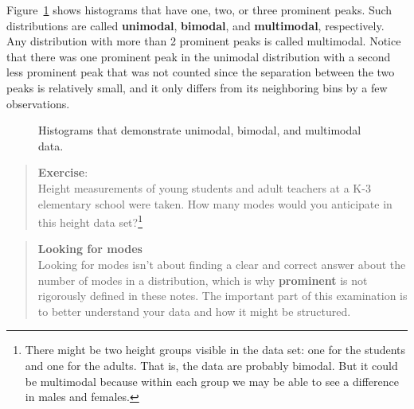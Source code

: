 \documentclass[
  letterpaper,
  DIV=11,
  numbers=noendperiod]{scrreprt}
\begin{document}
Figure~\ref{fig-histmulti} shows histograms that have one, two, or three
prominent peaks. Such distributions are called \textbf{unimodal},
\textbf{bimodal}, and \textbf{multimodal}, respectively. Any
distribution with more than 2 prominent peaks is called multimodal.
Notice that there was one prominent peak in the unimodal distribution
with a second less prominent peak that was not counted since the
separation between the two peaks is relatively small, and it only
differs from its neighboring bins by a few observations.

\begin{figure}


\caption{\label{fig-histmulti}Histograms that demonstrate unimodal,
bimodal, and multimodal data.}

\end{figure}%

\begin{quote}
\textbf{Exercise}:\\
Height measurements of young students and adult teachers at a K-3
elementary school were taken. How many modes would you anticipate in
this height data set?\footnote{There might be two height groups visible
  in the data set: one for the students and one for the adults. That is,
  the data are probably bimodal. But it could be multimodal because
  within each group we may be able to see a difference in males and
  females.}
\end{quote}

\begin{quote}
\textbf{Looking for modes}\\
Looking for modes isn't about finding a clear and correct answer about
the number of modes in a distribution, which is why \textbf{prominent}
is not rigorously defined in these notes. The important part of this
examination is to better understand your data and how it might be
structured.
\end{quote}
\end{document}
